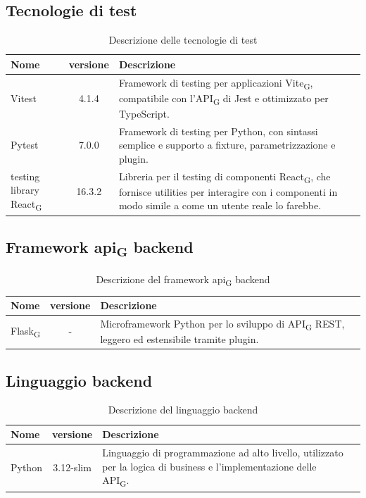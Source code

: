 \documentclass[11pt,a4paper]{article}
\newcommand{\gls}[1]{#1\textsubscript{G}}
\begin{document}
\subsection{Tecnologie di test}
    \begin{table}[H]
        \centering
        \begin{tabular}{|l|c|>{\raggedright\arraybackslash}p{}|p{}|}
            \hline
            \textbf{Nome} & \textbf{versione} & \textbf{Descrizione} \\
            \hline
            Vitest & 4.1.4 & Framework di testing per applicazioni \gls{Vite}, compatibile con l'\gls{API} di Jest e ottimizzato per TypeScript. \\
            \hline
            Pytest & 7.0.0 & Framework di testing per Python, con sintassi semplice e supporto a fixture, parametrizzazione e plugin. \\
            \hline
            testing library \gls{React} & 16.3.2 & Libreria per il testing di componenti \gls{React}, che fornisce utilities per interagire con i componenti in modo simile a come un utente reale lo farebbe. \\
            \hline
        \end{tabular}
        \caption{Descrizione delle tecnologie di test}
        \label{tab:tecnologie_test}
    \end{table}
\subsection{Framework \gls{api} backend}
    \begin{table}[H]
        \centering
        \begin{tabular}{|l|c|>{\raggedright\arraybackslash}p{}|p{}|}
            \hline
            \textbf{Nome} & \textbf{versione} & \textbf{Descrizione} \\
            \hline
            \gls{Flask} & - & Microframework Python per lo sviluppo di \gls{API} REST, leggero ed estensibile tramite plugin. \\
            \hline
        \end{tabular}
        \caption{Descrizione del framework \gls{api} backend}
        \label{tab:api_backend}
    \end{table}
\subsection{Linguaggio backend}
    \begin{table}[H]
        \centering
        \begin{tabular}{|l|c|>{\raggedright\arraybackslash}p{}|p{}|}
            \hline
            \textbf{Nome} & \textbf{versione} & \textbf{Descrizione} \\
            \hline
            Python & 3.12-slim & Linguaggio di programmazione ad alto livello, utilizzato per la logica di business e l'implementazione delle \gls{API}. \\
            \hline
        \end{tabular}
        \caption{Descrizione del linguaggio backend}
        \label{tab:linguaggio_backend}
    \end{table}
\end{document}
